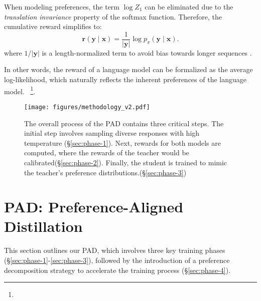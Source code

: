 When modeling preferences, the term $\log Z_1$ can be eliminated due to the \textit{translation invariance} property of the softmax function. Therefore, the cumulative reward simplifies to:
\begin{equation}
    \boldsymbol{r}(\boldsymbol{y} \mid \boldsymbol{x}) = \frac{1}{|\boldsymbol{y}|} \log p_\pi(\boldsymbol{y} \mid \boldsymbol{x}).
\label{eq:sim-reward}
\end{equation}
where $1/|\boldsymbol{y}|$ is a length-normalized term to avoid bias towards longer sequences \citep{meng-2024-simpo, gu-2024-minillm}.

In other words, the reward of a language model can be formalized as the average log-likelihood, which naturally reflects the inherent preferences of the language model. ~\footnote{}.



\begin{figure*}[ht]
    \centering
    \vspace{-4mm}
    \texttt{[image: figures/methodology\_v2.pdf]}
    \vspace{-8mm}
    \caption{The overall process of the PAD contains three critical steps. The initial step involves sampling diverse responses with high temperature (§\ref{sec:phase-1}). Next, rewards for both models are computed, where the rewards of the teacher would be calibrated(§\ref{sec:phase-2}). Finally, the student is trained to mimic the teacher's preference distributions.(§\ref{sec:phase-3})}
    \vspace{-4mm}
    \label{fig:method}
\end{figure*}

\section{PAD: Preference-Aligned Distillation}

\label{sec:method}
This section outlines our PAD, which involves three key training phases (§\ref{sec:phase-1}-\ref{sec:phase-3}), followed by the introduction of a preference decomposition strategy to accelerate the training process (§\ref{sec:phase-4}).

